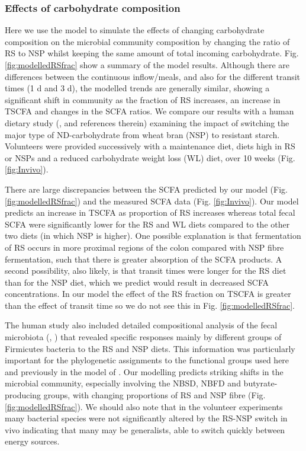 \documentclass[a4paper]{article}
\begin{document}
\subsubsection*{Effects of carbohydrate composition}
Here we use the model to simulate the effects of changing carbohydrate composition on the microbial community composition by changing the ratio of RS to NSP whilst keeping the same amount of total incoming carbohydrate.
Fig. \ref{fig:modelledRSfrac} show a summary of the model results. 
Although there are differences between the continuous inflow/meals, and also for the different transit times (1 d and 3 d), the modelled trends are generally similar, showing a significant shift in community as the fraction of RS increases, an increase in TSCFA and changes in the SCFA ratios. 
We compare our results with a human dietary study (\cite{walker2011}, \cite{salonen} and references therein) examining the impact of switching the major type of ND-carbohydrate from wheat bran (NSP) to resistant starch.
Volunteers were provided successively with a maintenance diet, diets high in RS or NSPs and a reduced carbohydrate weight loss (WL) diet, over 10 weeks (Fig. \ref{fig:Invivo}).

There are large discrepancies between the SCFA predicted by our model (Fig. \ref{fig:modelledRSfrac}) and the measured SCFA data (Fig. \ref{fig:Invivo}). 
Our model predicts an increase in TSCFA as proportion of RS increases whereas total fecal SCFA were significantly lower for the RS and WL diets compared to the other two diets (in which NSP is higher). 
One possible explanation is that fermentation of RS occurs in more proximal regions of the colon compared with NSP fibre fermentation, such that there is greater absorption of the SCFA products.
A second possibility, also likely, is that transit times were longer for the RS diet than for the NSP diet, which we predict would result in decreased SCFA concentrations.
In our model the effect of the RS fraction on TSCFA is greater than the effect of transit time so we do not see this in Fig. \ref{fig:modelledRSfrac}.


The human study also included detailed compositional analysis of the fecal microbiota (\cite{walker2011}, \cite{salonen}) that revealed specific responses mainly by different groups of Firmicutes bacteria to the RS and NSP diets. This information was particularly important for the phylogenetic assignments to the functional groups used here and previously in the model of \cite{Kettle2015}. Our modelling predicts striking shifts in the microbial community, especially involving the NBSD, NBFD and butyrate-producing groups, with changing proportions of RS and NSP fibre (Fig. \ref{fig:modelledRSfrac}). 
We should also note that in the volunteer experiments many bacterial species were not significantly altered by the RS-NSP switch in vivo \citep{walker2011} indicating that many may be generalists, able to switch quickly between energy sources.
\end{document}
